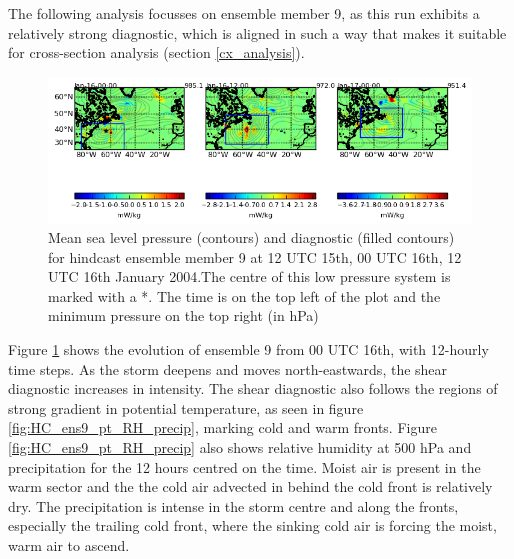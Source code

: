 The following analysis focusses on ensemble member 9, as this run exhibits a relatively strong diagnostic, which is aligned in such a way that makes it suitable for cross-section analysis (section \ref{cx_analysis}).

\begin{figure}[h]
	\centering
	\includegraphics[width=34pc,angle=0]{plot_var_poly_ens9_diag500_msl_12UTC_15_3cb.png} %
	\caption{Mean sea level pressure (contours) and diagnostic (filled contours) for hindcast ensemble member 9 at 12 UTC 15th, 00 UTC 16th, 12 UTC 16th January 2004.The centre of this low pressure system is marked with a *. The time is on the top left of the plot and the minimum pressure on the top right (in hPa)}\label{fig:HC_ens9}
	\centering
\end{figure}

Figure \ref{fig:HC_ens9} shows the evolution of ensemble 9 from 00 UTC 16th, with 12-hourly time steps. As the storm deepens and moves north-eastwards, the shear diagnostic increases in intensity. The shear diagnostic also follows the regions of strong gradient in potential temperature, as seen in figure \ref{fig:HC_ens9_pt_RH_precip}, marking cold and warm fronts. Figure \ref{fig:HC_ens9_pt_RH_precip} also shows relative humidity at 500 hPa and precipitation for the 12 hours centred on the time. Moist air is present in the warm sector and the the cold air advected in behind the cold front is relatively dry. The precipitation is intense in the storm centre and along the fronts, especially the trailing cold front, where the sinking cold air is forcing the moist, warm air to ascend.


